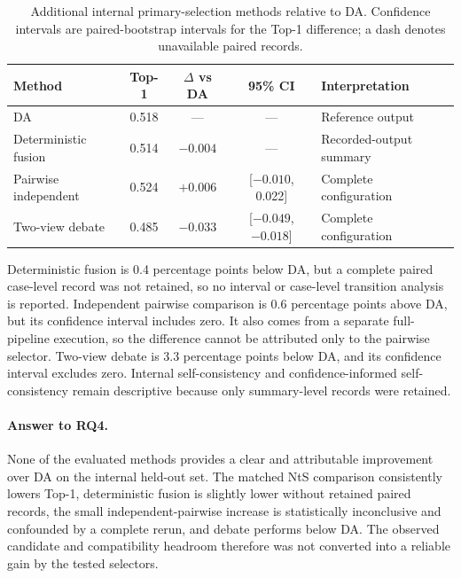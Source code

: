 \begin{table}[htbp]
\centering
\caption{Additional internal primary-selection methods relative to DA. Confidence intervals are paired-bootstrap intervals for the Top-1 difference; a dash denotes unavailable paired records.}
\label{tab:internal-selection-results}
\small
\renewcommand{\arraystretch}{1.08}
\begin{tabularx}{\textwidth}{|>{\raggedright\arraybackslash}p{3.2cm}|c|c|c|X|}
\hline
Method & Top-1 & $\Delta$ vs DA & 95\% CI & Interpretation\\
\hline
DA & 0.518 & --- & --- & Reference output\\
\hline
Deterministic fusion & 0.514 & $-0.004$ & --- & Recorded-output summary\\
\hline
Pairwise independent & 0.524 & $+0.006$ & [$-0.010$, 0.022] & Complete configuration\\
\hline
Two-view debate & 0.485 & $-0.033$ & [$-0.049$, $-0.018$] & Complete configuration\\
\hline
\end{tabularx}
\renewcommand{\arraystretch}{1.0}
\end{table}

Deterministic fusion is 0.4 percentage points below DA, but a complete paired case-level record was not retained, so no interval or case-level transition analysis is reported. Independent pairwise comparison is 0.6 percentage points above DA, but its confidence interval includes zero. It also comes from a separate full-pipeline execution, so the difference cannot be attributed only to the pairwise selector. Two-view debate is 3.3 percentage points below DA, and its confidence interval excludes zero. Internal self-consistency and confidence-informed self-consistency remain descriptive because only summary-level records were retained.

\paragraph{Answer to RQ4.}
None of the evaluated methods provides a clear and attributable improvement over DA on the internal held-out set. The matched NtS comparison consistently lowers Top-1, deterministic fusion is slightly lower without retained paired records, the small independent-pairwise increase is statistically inconclusive and confounded by a complete rerun, and debate performs below DA. The observed candidate and compatibility headroom therefore was not converted into a reliable gain by the tested selectors.

